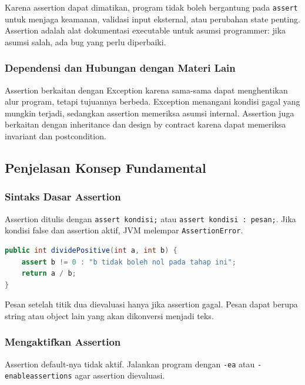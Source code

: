 Karena assertion dapat dimatikan, program tidak boleh bergantung pada \texttt{assert} untuk menjaga keamanan, validasi input eksternal, atau perubahan state penting. Assertion adalah alat dokumentasi executable untuk asumsi programmer: jika asumsi salah, ada bug yang perlu diperbaiki.

\subsubsection{Dependensi dan Hubungan dengan Materi Lain}

Assertion berkaitan dengan Exception karena sama-sama dapat menghentikan alur program, tetapi tujuannya berbeda. Exception menangani kondisi gagal yang mungkin terjadi, sedangkan assertion memeriksa asumsi internal. Assertion juga berkaitan dengan inheritance dan design by contract karena dapat memeriksa invariant dan postcondition.

\subsection{Penjelasan Konsep Fundamental}

\subsubsection{Sintaks Dasar Assertion}

\begin{jawab}
Assertion ditulis dengan \texttt{assert kondisi;} atau \texttt{assert kondisi : pesan;}. Jika kondisi false dan assertion aktif, JVM melempar \texttt{AssertionError}.
\end{jawab}

\begin{lstlisting}[language=Java, caption={Sintaks dasar assert}, label={lst:assert-basic}]
public int dividePositive(int a, int b) {
    assert b != 0 : "b tidak boleh nol pada tahap ini";
    return a / b;
}
\end{lstlisting}

Pesan setelah titik dua dievaluasi hanya jika assertion gagal. Pesan dapat berupa string atau object lain yang akan dikonversi menjadi teks.

\subsubsection{Mengaktifkan Assertion}

\begin{jawab}
Assertion default-nya tidak aktif. Jalankan program dengan \texttt{-ea} atau \texttt{-enableassertions} agar assertion dievaluasi.
\end{jawab}

